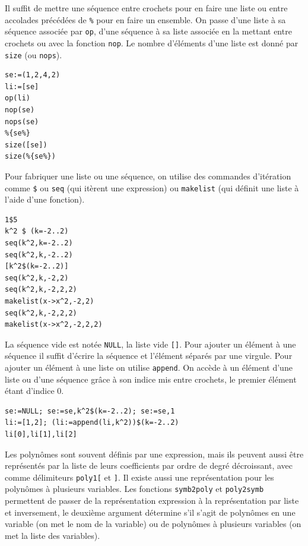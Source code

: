 \documentclass{article}
\begin{document}
Il suffit de mettre une s\'equence entre crochets pour en faire une liste
ou entre accolades pr\'ec\'ed\'ees de \verb|%| pour en faire un ensemble.
On passe d'une liste \`a sa s\'equence associ\'ee par \verb|op|, 
d'une s\'equence \`a sa liste associ\'ee en la mettant entre crochets
ou avec la fonction \verb|nop|.
Le nombre d'\'el\'ements d'une liste est donn\'e par \verb|size| 
(ou \verb|nops|).
\begin{verbatim}
se:=(1,2,4,2)
li:=[se]
op(li)
nop(se)
nops(se)
%{se%}
size([se])
size(%{se%})
\end{verbatim}
Pour fabriquer une liste ou une s\'equence, on utilise des commandes
d'it\'eration comme \verb|$| %
ou \verb|seq| (qui it\`erent une
expression) ou \verb|makelist| (qui d\'efinit une liste \`a l'aide d'une 
fonction).  
\begin{verbatim}
1$5
k^2 $ (k=-2..2)
seq(k^2,k=-2..2)
seq(k^2,k,-2..2)
[k^2$(k=-2..2)]
seq(k^2,k,-2,2)
seq(k^2,k,-2,2,2)
makelist(x->x^2,-2,2)
seq(k^2,k,-2,2,2)
makelist(x->x^2,-2,2,2)
\end{verbatim}
La s\'equence vide est not\'ee \verb|NULL|, la liste vide
\verb|[]|. Pour ajouter un \'el\'ement \`a une s\'equence il suffit
d'\'ecrire la s\'equence et l'\'el\'ement s\'epar\'es par une virgule. 
Pour ajouter un
\'el\'ement \`a une liste on utilise \verb|append|.
On acc\`ede \`a un \'el\'ement d'une liste ou d'une s\'equence gr\^ace 
\`a son indice mis entre 
crochets, le premier \'el\'ement \'etant d'indice 0.
\begin{verbatim}
se:=NULL; se:=se,k^2$(k=-2..2); se:=se,1
li:=[1,2]; (li:=append(li,k^2))$(k=-2..2)
li[0],li[1],li[2]
\end{verbatim}

Les polyn\^omes sont souvent d\'efinis par une expression, mais
ils peuvent aussi \^etre repr\'esent\'es 
par la liste de leurs coefficients par ordre
de degr\'e d\'ecroissant, avec comme d\'elimiteurs \verb|poly1[| et \verb|]|.
Il existe aussi une repr\'esentation
pour les polyn\^omes \`a plusieurs variables. Les fonctions
\verb|symb2poly| et \verb|poly2symb| permettent
de passer de la repr\'esentation expression \`a la repr\'esentation
par liste et inversement, 
le deuxi\`eme argument d\'etermine s'il s'agit de polyn\^omes
en une variable (on met le nom de la variable) ou de
polyn\^omes \`a plusieurs variables (on met la liste des variables).
\end{document}
